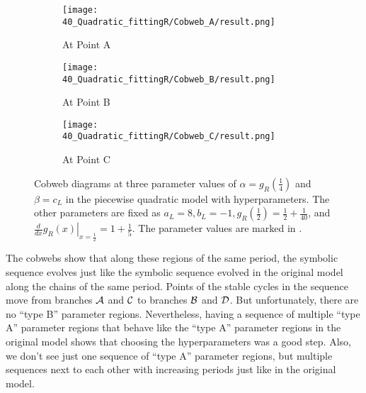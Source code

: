 \begin{figure}
	\centering
	\begin{subfigure}{0.3\textwidth}
		\centering
		\texttt{[image: 40\_Quadratic\_fittingR/Cobweb\_A/result.png]}
		\caption{At Point A}
		\label{fig:setup.quad.hyper.1.cobweb.A}
	\end{subfigure}
	\begin{subfigure}{0.3\textwidth}
		\centering
		\texttt{[image: 40\_Quadratic\_fittingR/Cobweb\_B/result.png]}
		\caption{At Point B}
		\label{fig:setup.quad.hyper.1.cobweb.B}
	\end{subfigure}
	\begin{subfigure}{0.3\textwidth}
		\centering
		\texttt{[image: 40\_Quadratic\_fittingR/Cobweb\_C/result.png]}
		\caption{At Point C}
		\label{fig:setup.quad.hyper.1.cobweb.C}
	\end{subfigure}
	\caption[Cobwebs of the first piecewise quadratic model with hyperparameters]{
	Cobweb diagrams at three parameter values of $\alpha = g_R\left(\frac{1}{4}\right)$ and $\beta = c_L$ in the piecewise quadratic model with hyperparameters.
	The other parameters are fixed as $a_L = 8, b_L = -1, g_R\left(\frac{1}{2}\right) = \frac{1}{2} + \frac{1}{40}$, and $\left. \frac{d}{dx} g_R(x) \right|_{x = \frac{1}{2}} = 1 + \frac{1}{5}$.
	The parameter values are marked in .
	}
	\label{fig:setup.quad.hyper.cobwebs}
\end{figure}


The cobwebs show that along these regions of the same period, the symbolic sequence evolves just like the symbolic sequence evolved in the original model along the chains of the same period.
Points of the stable cycles in the sequence move from branches $\mathcal{A}$ and $\mathcal{C}$ to branches $\mathcal{B}$ and $\mathcal{D}$.
But unfortunately, there are no ``type B'' parameter regions.
Nevertheless, having a sequence of multiple ``type A'' parameter regions that behave like the ``type A'' parameter regions in the original model shows that choosing the hyperparameters was a good step.
Also, we don't see just one sequence of ``type A'' parameter regions, but multiple sequences next to each other with increasing periods just like in the original model.
